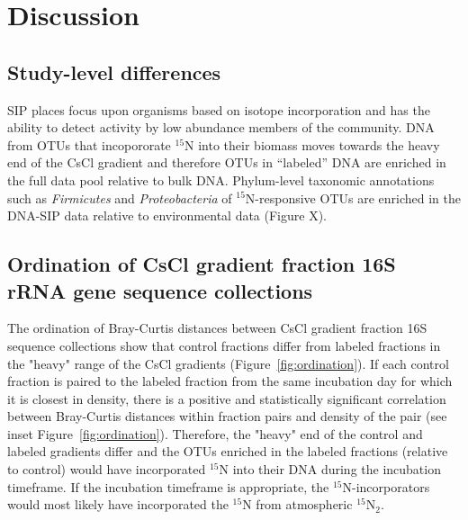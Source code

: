 \section{Discussion}
\subsection{Study-level differences}
SIP places focus upon organisms based on isotope incorporation and has the
ability to detect activity by low abundance members of the community.
DNA from OTUs that incopororate $^{15}$N into their biomass moves towards the
heavy end of the CsCl gradient and therefore OTUs in ``labeled'' DNA are
enriched in the full data pool relative to bulk DNA. Phylum-level taxonomic
annotations such as \textit{Firmicutes} and \textit{Proteobacteria} of
$^{15}$N-responsive OTUs are enriched in the DNA-SIP data relative to
environmental data (Figure X).

\subsection{Ordination of CsCl gradient fraction 16S rRNA gene sequence collections} 
The ordination of Bray-Curtis distances between CsCl gradient fraction 16S
sequence collections show that control fractions differ from labeled fractions
in the "heavy" range of the CsCl gradients (Figure~\ref{fig:ordination}). If
each control fraction is paired to the labeled fraction from the same
incubation day for which it is closest in density, there is a positive and
statistically significant correlation between Bray-Curtis distances within
fraction pairs and density of the pair (see inset Figure~\ref{fig:ordination}).
Therefore, the "heavy" end of the control and labeled gradients differ and the
OTUs enriched in the labeled fractions (relative to control) would have
incorporated $^{15}$N into their DNA during the incubation timeframe. If the
incubation timeframe is appropriate, the $^{15}$N-incorporators would most
likely have incorporated the $^{15}$N from atmospheric $^{15}$N$_{2}$.     

